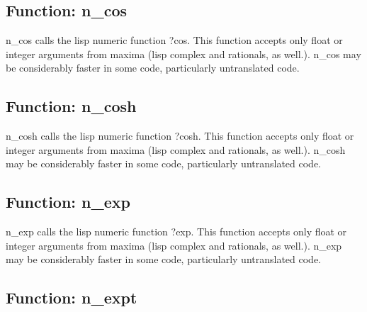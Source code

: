 \documentclass[]{article}
\begin{document}
\vspace{5 pt}


\subsection{Function: n\_cos\label{sec:n_cos}}
\hypertarget{n_cos}{}



\vspace{5 pt}
n\_cos calls the lisp numeric function ?cos. This function accepts only float or integer arguments from maxima (lisp complex and rationals, as well.). n\_cos may be considerably faster in some code, particularly untranslated code. 

\vspace{5 pt}


\subsection{Function: n\_cosh\label{sec:n_cosh}}
\hypertarget{n_cosh}{}



\vspace{5 pt}
n\_cosh calls the lisp numeric function ?cosh. This function accepts only float or integer arguments from maxima (lisp complex and rationals, as well.). n\_cosh may be considerably faster in some code, particularly untranslated code. 

\vspace{5 pt}


\subsection{Function: n\_exp\label{sec:n_exp}}
\hypertarget{n_exp}{}



\vspace{5 pt}
n\_exp calls the lisp numeric function ?exp. This function accepts only float or integer arguments from maxima (lisp complex and rationals, as well.). n\_exp may be considerably faster in some code, particularly untranslated code. 

\vspace{5 pt}


\subsection{Function: n\_expt\label{sec:n_expt}}
\hypertarget{n_expt}{}
\end{document}
